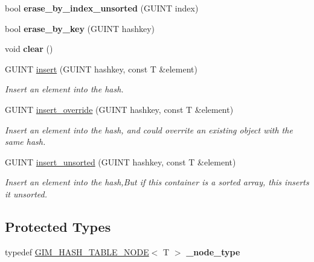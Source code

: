 \begin{DoxyCompactItemize}
\item 
\hypertarget{classgim__hash__table_a22cce5d8ed58cfb7e16d6b81aaf5acb7}{bool {\bfseries erase\+\_\+by\+\_\+index\+\_\+unsorted} (G\+U\+I\+N\+T index)}\label{classgim__hash__table_a22cce5d8ed58cfb7e16d6b81aaf5acb7}

\item 
\hypertarget{classgim__hash__table_a156d142f1eb74c3ef758a14fffe1763a}{bool {\bfseries erase\+\_\+by\+\_\+key} (G\+U\+I\+N\+T hashkey)}\label{classgim__hash__table_a156d142f1eb74c3ef758a14fffe1763a}

\item 
\hypertarget{classgim__hash__table_a1574ca1850a9258db8b778282134ff42}{void {\bfseries clear} ()}\label{classgim__hash__table_a1574ca1850a9258db8b778282134ff42}

\item 
G\+U\+I\+N\+T \hyperlink{classgim__hash__table_aff0e9bdb5bd6aacf9272db6789c514f7}{insert} (G\+U\+I\+N\+T hashkey, const T \&element)
\begin{DoxyCompactList}\small\item\em Insert an element into the hash. \end{DoxyCompactList}\item 
G\+U\+I\+N\+T \hyperlink{classgim__hash__table_a83987136757654921c71b183de8ec55e}{insert\+\_\+override} (G\+U\+I\+N\+T hashkey, const T \&element)
\begin{DoxyCompactList}\small\item\em Insert an element into the hash, and could overrite an existing object with the same hash. \end{DoxyCompactList}\item 
\hypertarget{classgim__hash__table_abe9a629ec7dfe612065ed9d161adc7e8}{G\+U\+I\+N\+T \hyperlink{classgim__hash__table_abe9a629ec7dfe612065ed9d161adc7e8}{insert\+\_\+unsorted} (G\+U\+I\+N\+T hashkey, const T \&element)}\label{classgim__hash__table_abe9a629ec7dfe612065ed9d161adc7e8}

\begin{DoxyCompactList}\small\item\em Insert an element into the hash,But if this container is a sorted array, this inserts it unsorted. \end{DoxyCompactList}\end{DoxyCompactItemize}
\subsection*{Protected Types}
\begin{DoxyCompactItemize}
\item 
\hypertarget{classgim__hash__table_a93f9195325cf57b3789e575a18a929a5}{typedef \hyperlink{struct_g_i_m___h_a_s_h___t_a_b_l_e___n_o_d_e}{G\+I\+M\+\_\+\+H\+A\+S\+H\+\_\+\+T\+A\+B\+L\+E\+\_\+\+N\+O\+D\+E}$<$ T $>$ {\bfseries \+\_\+node\+\_\+type}}\label{classgim__hash__table_a93f9195325cf57b3789e575a18a929a5}

\end{DoxyCompactItemize}
